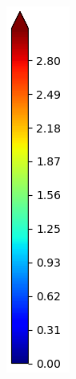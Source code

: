 \documentclass[journal=jpcbfk,manuscript=article]{achemso}
\begin{document}
\begin{figure}[!htb]
\begin{subfigure}{0.1\textwidth}
		\includegraphics[width=\linewidth]{colorbar_jet.png}

\end{subfigure}
\end{figure}
\end{document}
